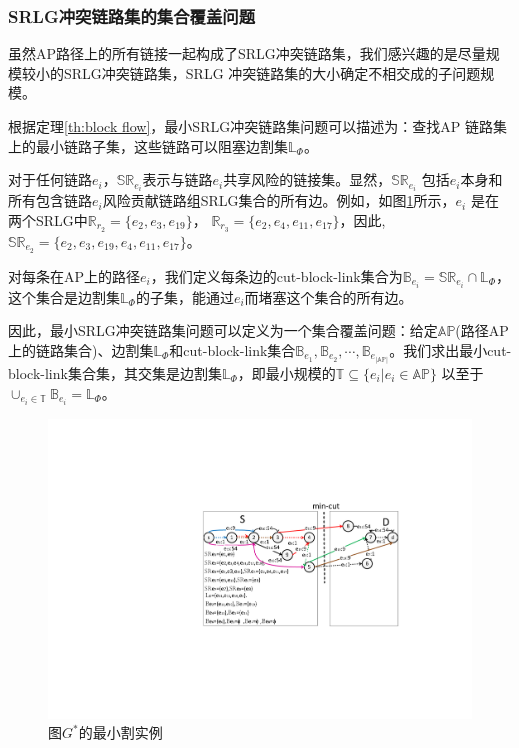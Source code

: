 \subsubsection{SRLG冲突链路集的集合覆盖问题}
虽然AP路径上的所有链接一起构成了SRLG冲突链路集，我们感兴趣的是尽量规模较小的SRLG冲突链路集，SRLG 冲突链路集的大小确定不相交成的子问题规模。

根据定理\ref{th:block flow}，最小SRLG冲突链路集问题可以描述为：查找AP 链路集上的最小链路子集，这些链路可以阻塞边割集$\mathbb{L}_{\Phi}$。

对于任何链路$e_i$，$\mathbb{SR}_{e_i}$表示与链路$e_i$共享风险的链接集。显然，$\mathbb{SR}_{e_i}$ 包括$e_i$本身和所有包含链路$e_i$风险贡献链路组SRLG集合的所有边。例如，如图\ref{fig:MinCutStarGraph}所示，$e_i$ 是在两个SRLG中$\mathbb{R}_{r_2}=\{e_2,e_3,e_{19}\}$， $\mathbb{R}_{r_3}=\{e_2,e_4,e_{11},e_{17}\}$，因此, $\mathbb{SR}_{e_2}=\{e_2,e_3,e_{19},e_4,e_{11},e_{17}\}$。

对每条在AP上的路径$e_i$，我们定义每条边的cut-block-link集合为${\mathbb{B}_{{e_i}}} = \mathbb{SR}_{{e_i}} \cap \mathbb{L}_{\Phi}$，这个集合是边割集$\mathbb{L}_{\Phi}$的子集，能通过$e_i$而堵塞这个集合的所有边。

因此，最小SRLG冲突链路集问题可以定义为一个集合覆盖问题：给定$\mathbb{AP}$(路径AP上的链路集合)、边割集$\mathbb{L}_{\Phi}$和cut-block-link集合${\mathbb{B}_{{e_1}}},{\mathbb{B}_{{e_2}}}, \cdots ,{\mathbb{B}_{{e_{|\mathbb{AP}|}}}}$。我们求出最小cut-block-link集合集，其交集是边割集$\mathbb{L}_{\Phi}$，即最小规模的$\mathbb{T} \subseteq \{e_i| e_i\in \mathbb{AP}\}$ 以至于 ${ \cup_{e_i \in \mathbb{T}}}{\mathbb{B}_{e_i}} = \mathbb{L}_{\Phi}$。


\begin{figure}[htbp]
  \centering
  \includegraphics[width=4.5in]{figures/MinCutStarGraph}
  \caption{图$G^*$的最小割实例}\label{fig:MinCutStarGraph}
  \label{fig:MinCutStarGraph}
\end{figure}

